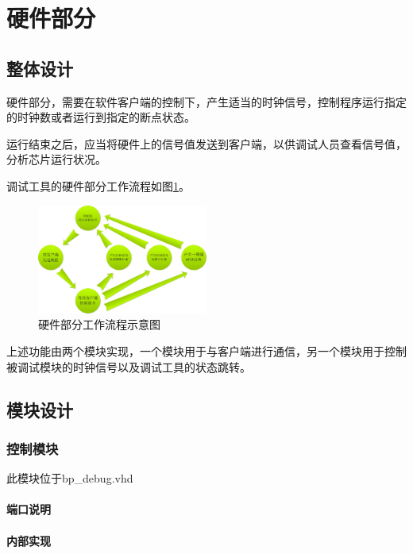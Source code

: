 \section{硬件部分}
    \subsection{整体设计}
        硬件部分，需要在软件客户端的控制下，产生适当的时钟信号，控制程序运行指定的时钟数或者运行到指定的断点状态。

        运行结束之后，应当将硬件上的信号值发送到客户端，以供调试人员查看信号值，分析芯片运行状况。

        调试工具的硬件部分工作流程如图\ref{process}。

        \begin{figure}[htbp!]
            \centering
            \caption{硬件部分工作流程示意图}\label{process}
            \includegraphics[width=0.5\textwidth]{chart/hardware_path.jpg}
        \end{figure}

        上述功能由两个模块实现，一个模块用于与客户端进行通信，另一个模块用于控制被调试模块的时钟信号以及调试工具的状态跳转。
    \subsection{模块设计}
        \subsubsection{控制模块}
            此模块位于bp\_debug.vhd

            \paragraph{端口说明}
            \mbox{}
                

            \paragraph{内部实现}
            \mbox{}

